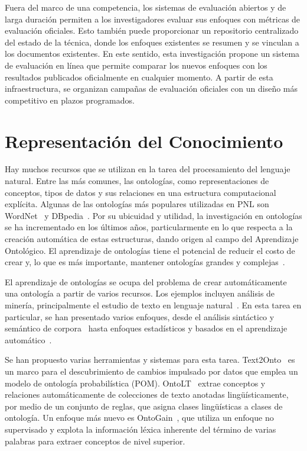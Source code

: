 Fuera del marco de una competencia, los sistemas de evaluación abiertos y de larga duración permiten a los investigadores evaluar sus enfoques con métricas de evaluación oficiales. Esto también puede proporcionar un repositorio centralizado del estado de la técnica, donde los enfoques existentes se resumen y se vinculan a los documentos existentes. En este sentido, esta investigación propone un sistema de evaluación en línea que permite comparar los nuevos enfoques con los resultados publicados oficialmente en cualquier momento. A partir de esta infraestructura, se organizan campañas de evaluación oficiales con un diseño más competitivo en plazos programados.

\section{Representación del Conocimiento}

Hay muchos recursos que se utilizan en la tarea del procesamiento del lenguaje natural. Entre las más comunes, las ontologías, como representaciones de conceptos, tipos de datos y sus relaciones en una estructura computacional explícita. Algunas de las ontologías más populares utilizadas en PNL son WordNet~\cite{} y DBpedia~\cite{}. Por su ubicuidad y utilidad, la investigación en ontologías se ha incrementado en los últimos años, particularmente en lo que respecta a la creación automática de estas estructuras, dando origen al campo del Aprendizaje Ontológico. El aprendizaje de ontologías tiene el potencial de reducir el costo de crear y, lo que es más importante, mantener ontologías grandes y complejas~\cite{cimiano2009ontology}.

El aprendizaje de ontologías se ocupa del problema de crear automáticamente una ontología a partir de varios recursos. Los ejemplos incluyen análisis de minería, principalmente
el estudio de texto en lenguaje natural~\cite{}. En esta tarea en particular, se han presentado varios enfoques, desde el análisis sintáctico y semántico de corpora~\cite{} hasta enfoques estadísticos y basados ​​en el aprendizaje automático~\cite{}.

Se han propuesto varias herramientas y sistemas para esta tarea. Text2Onto~\cite{cimiano2005text2onto} es un marco para el descubrimiento de cambios impulsado por datos que emplea un modelo de ontología probabilística (POM). OntoLT~\cite{buitelaar2004ontolt} extrae conceptos y relaciones automáticamente de colecciones de texto anotadas lingüísticamente, por medio de un conjunto de reglas, que asigna clases lingüísticas a clases de ontología. Un enfoque más nuevo es OntoGain~\cite{drymonas2010unsupervised}, que utiliza un enfoque no supervisado y explota la información léxica inherente del término de varias palabras para extraer conceptos de nivel superior.

